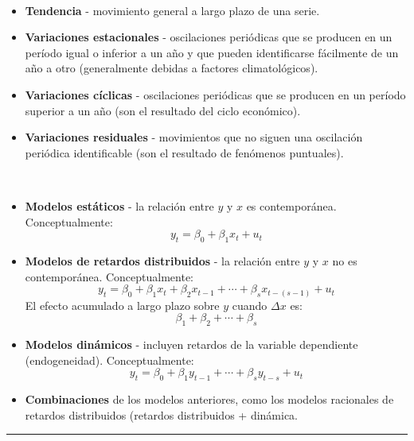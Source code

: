 \begin{f}{\ }
	
	\begin{itemize}[leftmargin=*]
		\item \textbf{Tendencia} - movimiento general a largo plazo de una serie.
		\item \textbf{Variaciones estacionales} - oscilaciones periódicas que se producen en un período igual o inferior a un año y que pueden identificarse fácilmente de un año a otro (generalmente debidas a factores climatológicos).
		\item \textbf{Variaciones cíclicas} - oscilaciones periódicas que se producen en un período superior a un año (son el resultado del ciclo económico).
		\item \textbf{Variaciones residuales} - movimientos que no siguen una oscilación periódica identificable (son el resultado de fenómenos puntuales).
	\end{itemize}
	
\end{f} 
\begin{f}{\ }
	
	\begin{itemize}[leftmargin=*]
		\item \textbf{Modelos estáticos} - la relación entre \(y\) y \(x\) es contemporánea. Conceptualmente:
		\[
		y_{t} = \beta_{0} + \beta_{1} x_{t} + u_{t}
		\]
		\item \textbf{Modelos de retardos distribuidos} - la relación entre \(y\) y \(x\) no es contemporánea. Conceptualmente:
		\[
		y_{t} = \beta_{0} + \beta_{1} x_{t} + \beta_{2} x_{t-1} + \cdots + \beta_{s} x_{t-(s-1)} + u_{t}
		\]
		El efecto acumulado a largo plazo sobre \(y\) cuando \(\Delta x\) es:
		\[
		\beta_{1} + \beta_{2} + \cdots + \beta_{s}
		\]
		\item \textbf{Modelos dinámicos} - incluyen retardos de la variable dependiente (endogeneidad). Conceptualmente:
		\[
		y_{t} = \beta_{0} + \beta_{1} y_{t-1} + \cdots + \beta_{s} y_{t-s} + u_{t}
		\]
		\item \textbf{Combinaciones} de los modelos anteriores, como los modelos racionales de retardos distribuidos (retardos distribuidos + dinámica.
	\end{itemize}
	
\end{f}
 \hrule 
 
